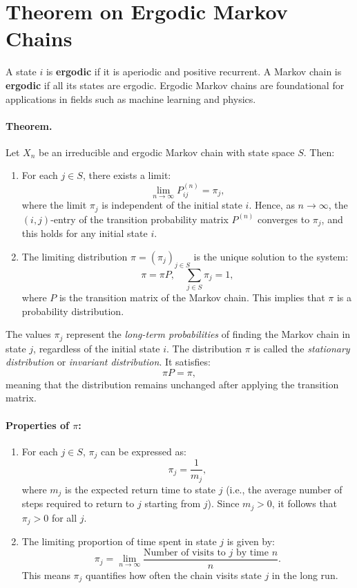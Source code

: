 \section{Theorem on Ergodic Markov Chains}
A state \( i \) is \textbf{ergodic} if it is aperiodic and positive recurrent. A Markov chain is \textbf{ergodic} if all its states are ergodic. Ergodic Markov chains are foundational for applications in fields such as machine learning and physics.
\paragraph{Theorem.}  
Let \( X_n \) be an irreducible and ergodic Markov chain with state space \( S \). Then:  
\begin{enumerate}
    \item For each \( j \in S \), there exists a limit:
   \[
   \lim_{n \to \infty} P_{ij}^{(n)} = \pi_j,
   \]
   where the limit \( \pi_j \) is independent of the initial state \( i \).  
   Hence, as \( n \to \infty \), the \( (i, j) \)-entry of the transition probability matrix \( P^{(n)} \) converges to \( \pi_j \), and this holds for any initial state \( i \).  
    \item The limiting distribution \( \pi = (\pi_j)_{j \in S} \) is the unique solution to the system:
   \[
   \pi = \pi P, \quad \sum_{j \in S} \pi_j = 1,
   \]
   where \( P \) is the transition matrix of the Markov chain. This implies that \( \pi \) is a probability distribution.
\end{enumerate}
The values \( \pi_j \) represent the \emph{long-term probabilities} of finding the Markov chain in state \( j \), regardless of the initial state \( i \). The distribution \( \pi \) is called the \emph{stationary distribution} or \emph{invariant distribution}. It satisfies:
   \[
   \pi P = \pi,
   \]
   meaning that the distribution remains unchanged after applying the transition matrix.

\paragraph{Properties of \( \pi \):}  
\begin{enumerate}
    \item For each \( j \in S \), \( \pi_j \) can be expressed as:
   \[
   \pi_j = \frac{1}{m_j},
   \]
   where \( m_j \) is the expected return time to state \( j \) (i.e., the average number of steps required to return to \( j \) starting from \( j \)).  
   Since \( m_j > 0 \), it follows that \( \pi_j > 0 \) for all \( j \).
   \item The limiting proportion of time spent in state \( j \) is given by:
   \[
   \pi_j = \lim_{n \to \infty} \frac{\text{Number of visits to } j \text{ by time } n}{n}.
   \]
   This means \( \pi_j \) quantifies how often the chain visits state \( j \) in the long run.
\end{enumerate}

